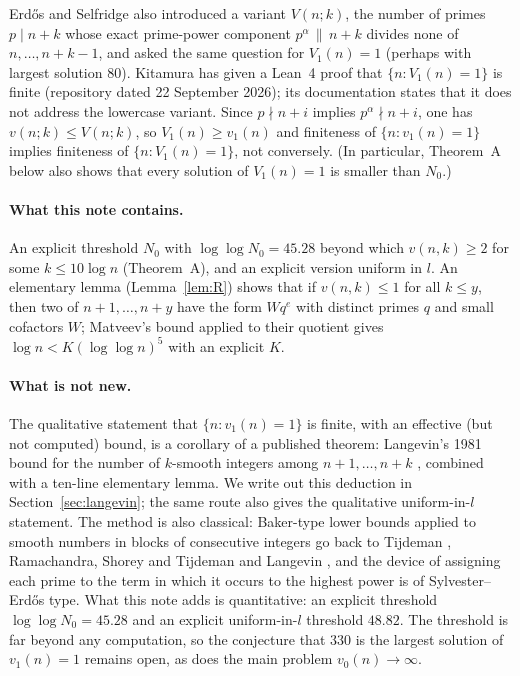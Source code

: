 \documentclass[10pt]{article}
\numberwithin{equation}{section}
\theoremstyle{definition}
\theoremstyle{plain}
\begin{document}
Erd\H{o}s and Selfridge also introduced a variant $V(n;k)$, the number of primes $p\mid n+k$ whose exact
prime-power component $p^{\alpha}\,\|\,n+k$ divides none of $n,\dots,n+k-1$, and asked the same question for
$V_1(n)=1$ (perhaps with largest solution $80$). Kitamura \cite{Ki26} has given a Lean~4 proof that
$\{n:V_1(n)=1\}$ is finite (repository dated 22 September 2026); its documentation states that it does not
address the lowercase variant. Since $p\nmid n+i$ implies $p^\alpha\nmid n+i$, one has $v(n;k)\le V(n;k)$, so
$V_1(n)\ge v_1(n)$ and finiteness of $\{n:v_1(n)=1\}$ implies finiteness of $\{n:V_1(n)=1\}$, not conversely.
(In particular, Theorem~A below also shows that every solution of $V_1(n)=1$ is smaller than $N_0$.)

\paragraph{What this note contains.} An explicit threshold $N_0$ with $\log\log N_0=45.28$ beyond which
$v(n,k)\ge2$ for some $k\le10\log n$ (Theorem~A), and an explicit version uniform in $l$. An elementary lemma
(Lemma~\ref{lem:R}) shows that if $v(n,k)\le1$ for all $k\le y$, then two of $n+1,\dots,n+y$ have the form
$Wq^{e}$ with distinct primes $q$ and small cofactors $W$; Matveev's bound \cite{Ma00} applied to their quotient
gives $\log n< K(\log\log n)^5$ with an explicit $K$.

\paragraph{What is not new.} The qualitative statement that $\{n:v_1(n)=1\}$ is finite, with an effective
(but not computed) bound, is a corollary of a published theorem: Langevin's 1981 bound for the number of
$k$-smooth integers among $n+1,\dots,n+k$ \cite[Corollaire~1, (8)]{La81}, combined with a ten-line elementary
lemma. We write out this deduction in Section~\ref{sec:langevin}; the same route also gives the qualitative
uniform-in-$l$ statement. The method is also classical: Baker-type lower bounds applied to smooth numbers in
blocks of consecutive integers go back to Tijdeman \cite{Ti73}, Ramachandra, Shorey and Tijdeman
\cite{RST75,RST76} and Langevin \cite{La81}, and the device of assigning each prime to the term in which it occurs
to the highest power is of Sylvester--Erd\H{o}s type. What this note adds is quantitative: an explicit threshold
$\log\log N_0=45.28$ and an explicit uniform-in-$l$ threshold $48.82$. The threshold is far beyond any
computation, so the conjecture that $330$ is the largest solution of $v_1(n)=1$ remains open, as does the main
problem $v_0(n)\to\infty$.
\end{document}
